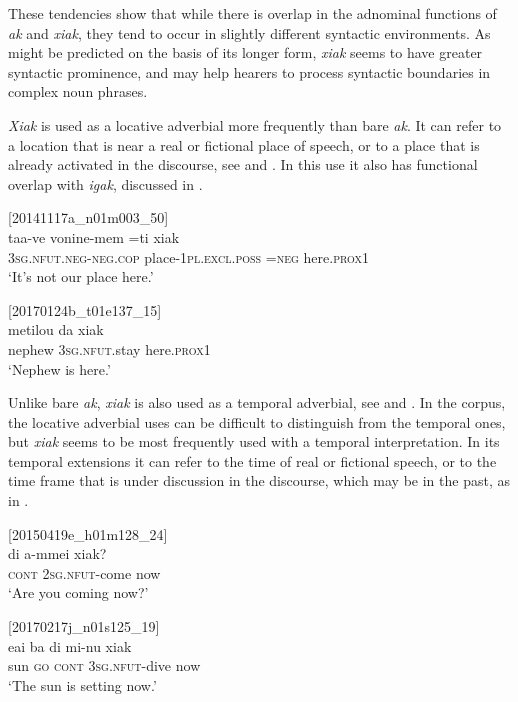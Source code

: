 \documentclass[output=paper,colorlinks,citecolor=brown]{langscibook}
\begin{document}
These tendencies show that while there is overlap in the adnominal functions of \textit{ak} and \textit{xiak}, they tend to occur in slightly different syntactic environments. As might be predicted on the basis of its longer form, \textit{xiak} seems to have greater syntactic prominence, and may help hearers to process syntactic boundaries in complex noun phrases.

\textit{Xiak} is used as a locative adverbial more frequently than bare \textit{ak}. It can refer to a location that is near a real or fictional place of speech, or to a place that is already activated in the discourse, see  and . In this use it also has functional overlap with \textit{igak}, discussed in .

\ea
{\label{ex:ridge:21}[20141117a\_n01m003\_50]}\\
\gll taa-ve        vonine-mem        =ti  xiak\\
     \textsc{3sg.nfut.neg-neg.cop}   place-\textsc{1pl.excl.poss}   \textsc{=neg} here.\textsc{prox}1\\
\glt ‘It’s not our place here.’
\z

\ea
{\label{ex:ridge:22}[20170124b\_t01e137\_15]}\\
\gll metilou  da      xiak\\
     nephew  \textsc{3sg.nfut.}stay  here.\textsc{prox}1\\
\glt ‘Nephew is here.’
\z

Unlike bare \textit{ak}, \textit{xiak} is also used as a temporal adverbial, see  and . In the corpus, the locative adverbial uses can be difficult to distinguish from the temporal ones, but \textit{xiak} seems to be most frequently used with a temporal interpretation. In its temporal extensions it can refer to the time of real or fictional speech, or to the time frame that is under discussion in the discourse, which may be in the past, as in .

\ea
{\label{ex:ridge:23}[20150419e\_h01m128\_24]}\\
\gll di     a-mmei    xiak?\\
     \textsc{cont}  \textsc{2sg.nfut-}come  now\\
\glt ‘Are you coming now?’
\z

\ea
{\label{ex:ridge:24}[20170217j\_n01s125\_19]}\\
\gll eai  ba  di  mi-nu      xiak\\
     sun  \textsc{go}  \textsc{cont}  \textsc{3sg.nfut}{}-dive  now\\
\glt ‘The sun is setting now.’
\z
\end{document}
